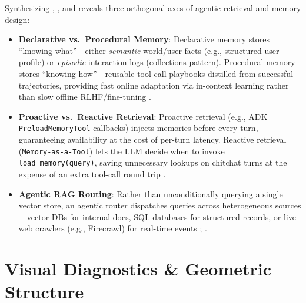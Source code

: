 \documentclass[../../../../master.tex]{subfiles}
\begin{document}
\begin{crossbook}
\label{crossbook:rag:memory_routing}
Synthesizing , , and  reveals three orthogonal axes of agentic retrieval and memory design:
\begin{itemize}
  \item \textbf{Declarative vs.\ Procedural Memory}: Declarative memory stores ``knowing what''---either \emph{semantic} world/user facts (e.g., structured user profile) or \emph{episodic} interaction logs (collections pattern). Procedural memory stores ``knowing how''---reusable tool-call playbooks distilled from successful trajectories, providing fast online adaptation via in-context learning rather than slow offline RLHF/fine-tuning .
  \item \textbf{Proactive vs.\ Reactive Retrieval}: Proactive retrieval (e.g., ADK \texttt{PreloadMemoryTool} callbacks) injects memories before every turn, guaranteeing availability at the cost of per-turn latency. Reactive retrieval (\texttt{Memory-as-a-Tool}) lets the LLM decide when to invoke \texttt{load\_memory(query)}, saving unnecessary lookups on chitchat turns at the expense of an extra tool-call round trip .
  \item \textbf{Agentic RAG Routing}: Rather than unconditionally querying a single vector store, an agentic router dispatches queries across heterogeneous sources---vector DBs for internal docs, SQL databases for structured records, or live web crawlers (e.g., Firecrawl) for real-time events ; .
\end{itemize}
\end{crossbook}

\section{Visual Diagnostics \& Geometric Structure}
\label{sec:rag:visuals}
\end{document}
